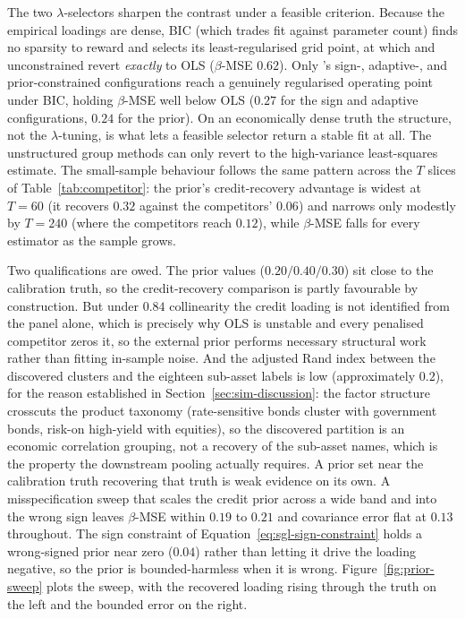 \documentclass[article]{jss}
\begin{document}
The two $\lambda$-selectors sharpen the contrast under a feasible
criterion. Because the empirical
loadings are dense, BIC (which trades fit against parameter count)
finds no sparsity to reward and selects its least-regularised grid
point, at which  and unconstrained
 revert \emph{exactly} to OLS ($\beta$-MSE $0.62$). Only
's sign-, adaptive-, and prior-constrained configurations
reach a genuinely regularised operating point under BIC, holding
$\beta$-MSE well below OLS ($0.27$ for the sign and adaptive
configurations, $0.24$ for the prior). On an economically dense truth the
structure, not the $\lambda$-tuning, is what lets a feasible selector
return a stable fit at all. The unstructured group methods can only
revert to the high-variance least-squares estimate. The small-sample
behaviour follows the same pattern across the $T$ slices of
Table~\ref{tab:competitor}: the prior's credit-recovery advantage is widest
at $T = 60$ (it recovers $0.32$ against the competitors' $0.06$) and
narrows only modestly by $T = 240$ (where the competitors reach
$0.12$), while $\beta$-MSE falls for every
estimator as the sample grows.

Two qualifications are owed. The prior values ($0.20/0.40/0.30$) sit
close to the calibration truth, so the credit-recovery comparison is
partly favourable by construction. But under $0.84$ collinearity the
credit loading is not identified from the panel alone, which is
precisely why OLS is unstable and every penalised competitor zeros it,
so the external prior performs necessary structural work rather than
fitting in-sample noise. And the adjusted Rand index between the
discovered clusters and the eighteen sub-asset labels is low
(approximately $0.2$), for the reason established in
Section~\ref{sec:sim-discussion}: the factor structure crosscuts the
product taxonomy (rate-sensitive bonds cluster with government bonds,
risk-on high-yield with equities), so the discovered partition is an
economic correlation grouping, not a recovery of the sub-asset names,
which is the property the downstream pooling actually requires. A prior
set near the calibration truth recovering that truth is weak evidence
on its own. A misspecification sweep that scales the credit prior across
a wide band and into the wrong sign leaves $\beta$-MSE within $0.19$ to
$0.21$ and covariance error flat at $0.13$ throughout. The sign
constraint of Equation~\ref{eq:sgl-sign-constraint} holds a wrong-signed
prior near zero ($0.04$) rather than letting it drive the loading
negative, so the prior is bounded-harmless when it is wrong.
Figure~\ref{fig:prior-sweep} plots the sweep, with the recovered loading
rising through the truth on the left and the bounded error on the right.
\end{document}
